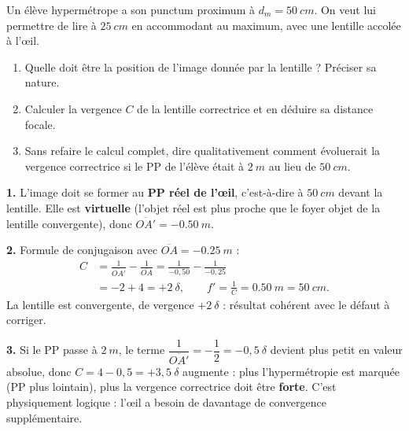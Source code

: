 \documentclass[11pt]{article}
\begin{document}
\begin{exercice}
Un élève hypermétrope a son punctum proximum à $d_m = \SI{50}{cm}$. On veut lui permettre de lire à $\SI{25}{cm}$ en accommodant au maximum, avec une lentille accolée à l'œil.
\begin{enumerate}
\item Quelle doit être la position de l'image donnée par la lentille ? Préciser sa nature.
\item Calculer la vergence $C$ de la lentille correctrice et en déduire sa distance focale.
\item Sans refaire le calcul complet, dire qualitativement comment évoluerait la vergence correctrice si le PP de l'élève était à $\SI{2}{m}$ au lieu de $\SI{50}{cm}$.
\end{enumerate}
\end{exercice}

\begin{corrige}
\textbf{1.} L'image doit se former au \textbf{PP réel de l'œil}, c'est-à-dire à $\SI{50}{cm}$ devant la lentille. Elle est \textbf{virtuelle} (l'objet réel est plus proche que le foyer objet de la lentille convergente), donc $\overline{OA'} = -\SI{0,50}{m}$.

\textbf{2.} Formule de conjugaison avec $\overline{OA} = -\SI{0,25}{m}$ :
\begin{align*}
C &= \frac{1}{\overline{OA'}} - \frac{1}{\overline{OA}} = \frac{1}{-0{,}50} - \frac{1}{-0{,}25} \\
&= -2 + 4 = +2\ \delta,
\qquad f' = \frac{1}{C} = \SI{0,50}{m} = \SI{50}{cm}.
\end{align*}
La lentille est convergente, de vergence $+2\ \delta$ : résultat cohérent avec le défaut à corriger.

\textbf{3.} Si le PP passe à $\SI{2}{m}$, le terme $\dfrac{1}{\overline{OA'}} = -\dfrac{1}{2} = -0{,}5\ \delta$ devient plus petit en valeur absolue, donc $C = 4 - 0{,}5 = +3{,}5\ \delta$ augmente : plus l'hypermétropie est marquée (PP plus lointain), plus la vergence correctrice doit être \textbf{forte}. C'est physiquement logique : l'œil a besoin de davantage de convergence supplémentaire.
\end{corrige}
\end{document}
